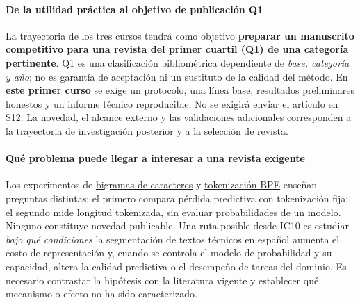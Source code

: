 \paragraph{De la utilidad práctica al objetivo de publicación Q1}
\label{s01:mod:invest}
\begin{investigacion}
La trayectoria de los tres cursos tendrá como objetivo
\textbf{preparar un manuscrito competitivo para una revista del primer
cuartil (Q1) de una categoría pertinente}. Q1 es una clasificación
bibliométrica dependiente de \emph{base, categoría y año}; no es garantía
de aceptación ni un sustituto de la calidad del método.
En \textbf{este primer curso} se exige un protocolo, una línea base,
resultados preliminares honestos y un informe técnico reproducible.
No se exigirá enviar el artículo en S12. La novedad, el alcance externo y
las validaciones adicionales corresponden a la trayectoria de investigación
posterior y a la selección de revista.
\end{investigacion}
\paragraph{Qué problema puede llegar a interesar a una revista exigente}
Los experimentos de \hyperref[s01:lab:comp]{bigramas de caracteres}
y \hyperref[s01:lab:ic10]{tokenización BPE} enseñan preguntas distintas:
el primero compara pérdida predictiva con tokenización fija; el segundo
mide longitud tokenizada, sin evaluar probabilidades de un modelo.
Ninguno constituye novedad publicable. Una ruta posible desde IC10 es estudiar
\emph{bajo qué condiciones} la segmentación de textos técnicos en español
aumenta el costo de representación y, cuando se controla el modelo de
probabilidad y su capacidad, altera la calidad predictiva o el desempeño
de tareas del dominio. Es necesario contrastar la hipótesis con la literatura
vigente y establecer qué mecanismo o efecto no ha sido caracterizado.
